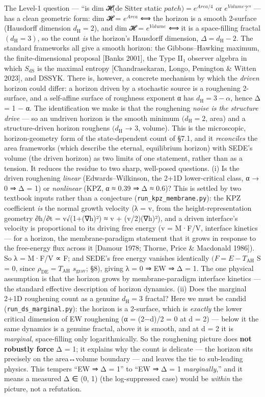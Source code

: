 \documentclass[
  10pt,
]{article}
\begin{document}
The Level-1 question --- ``is dim 𝓗(de Sitter static
\(patch) = e^{Area/4}\) or \(e^{Volume}\)?'' --- has a clean geometric
form: dim 𝓗 = \(e^{Area}\) ⟺ the horizon is a smooth 2-surface
(Hausdorff dimension \(d_{\mathrm{H}} = 2\)), and dim 𝓗 = \(e^{Volume}\)
⟺ it is a space-filling fractal \((d_{\mathrm{H}} = 3)\), so the count
\emph{is} the horizon's Hausdorff dimension,
\(\Delta  = d_{\mathrm{H}} - 2\). The standard frameworks all give a
smooth horizon: the Gibbons--Hawking maximum, the finite-dimensional
proposal {[}Banks 2001{]}, the Type II₁ observer algebra in which
\(S_{\mathrm{dS}}\) is the maximal entropy {[}Chandrasekaran, Longo,
Penington \& Witten 2023{]}, and DSSYK. There is, however, a concrete
mechanism by which the \emph{driven} horizon could differ: a horizon
driven by a stochastic source is a roughening 2-surface, and a
self-affine surface of roughness exponent α has
\(d_{\mathrm{H}} = 3 - \alpha\), hence Δ = 1 − α. The identification we
make is that the roughening \emph{noise is the structure drive} --- so
an undriven horizon is the smooth minimum \((d_{\mathrm{H}} = 2\), area)
and a structure-driven horizon roughens \((d_{\mathrm{H}}\) → 3,
volume). This is the microscopic, horizon-geometry form of the
state-dependent count of §7.1, and it \emph{reconciles} the area
frameworks (which describe the eternal, equilibrium horizon) with SEDE's
volume (the driven horizon) as two limits of one statement, rather than
as a tension. It reduces the residue to two sharp, well-posed questions.
(i) Is the driven roughening \emph{linear} (Edwards--Wilkinson, the 2+1D
lower-critical class, α → 0 ⇒ Δ = 1) or \emph{nonlinear} (KPZ, α ≈ 0.39
⇒ Δ ≈ 0.6)? This is settled by two textbook inputs rather than a
conjecture (\texttt{run\_kpz\_membrane.py}): the KPZ coefficient
\emph{is} the normal growth velocity (λ = v, from the
height-representation geometry ∂h/∂t = v√(1+(∇h)²) ≈ v + (v/2)(∇h)²),
and a driven interface's velocity is proportional to its driving free
energy (v = M·F/V, interface kinetics --- for a horizon, the
membrane-paradigm statement that it grows in response to the free-energy
flux across it {[}Damour 1978; Thorne, Price \& Macdonald 1986{]}). So λ
= M·F/V ∝ F; and SEDE's free energy vanishes identically
\((F = E - T_{\mathrm{AH}}\) S = 0, since
\(\rho _{\mathrm{DE}} = T_{\mathrm{AH}}\) \(s_{\mathrm{grav}}\); §8),
giving λ = 0 ⇒ EW ⇒ Δ = 1. The one physical assumption is that the
horizon grows by membrane-paradigm interface kinetics --- the standard
effective description of horizon dynamics. (ii) Does the marginal 2+1D
roughening count as a genuine \(d_{\mathrm{H}} = 3\) fractal? Here we
must be candid (\texttt{run\_ds\_marginal.py}): the horizon is a
2-surface, which is \emph{exactly} the lower critical dimension of EW
roughening (α = (2−d)/2 = 0 at d = 2) --- below it the same dynamics is
a genuine fractal, above it is smooth, and at d = 2 it is
\emph{marginal}, space-filling only logarithmically. So the roughening
picture does \textbf{not robustly force} Δ = 1; it explains why the
count is delicate --- the horizon sits precisely on the area↔volume
boundary --- and leaves the tie to sub-leading physics. This tempers
``EW ⇒ Δ = 1'' to ``EW ⇒ Δ = 1 \emph{marginally},'' and it means a
measured Δ ∈ (0, 1) (the log-suppressed case) would be \emph{within} the
picture, not a refutation.
\end{document}
